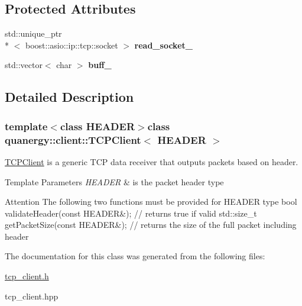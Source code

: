 \subsection*{Protected Attributes}
\begin{DoxyCompactItemize}
\item 
\hypertarget{classquanergy_1_1client_1_1TCPClient_a3169f1eb8c9ed9b452cd12ba4d51cd44}{std\-::unique\-\_\-ptr\\*
$<$ boost\-::asio\-::ip\-::tcp\-::socket $>$ {\bfseries read\-\_\-socket\-\_\-}}\label{classquanergy_1_1client_1_1TCPClient_a3169f1eb8c9ed9b452cd12ba4d51cd44}

\item 
\hypertarget{classquanergy_1_1client_1_1TCPClient_ab99a028a1b6efe74a8f62ed1f9323449}{std\-::vector$<$ char $>$ {\bfseries buff\-\_\-}}\label{classquanergy_1_1client_1_1TCPClient_ab99a028a1b6efe74a8f62ed1f9323449}

\end{DoxyCompactItemize}


\subsection{Detailed Description}
\subsubsection*{template$<$class H\-E\-A\-D\-E\-R$>$class quanergy\-::client\-::\-T\-C\-P\-Client$<$ H\-E\-A\-D\-E\-R $>$}

\hyperlink{classquanergy_1_1client_1_1TCPClient}{T\-C\-P\-Client} is a generic T\-C\-P data receiver that outputs packets based on header. 


\begin{DoxyTemplParams}{Template Parameters}
{\em H\-E\-A\-D\-E\-R} & is the packet header type \\
\hline
\end{DoxyTemplParams}
\begin{DoxyAttention}{Attention}
The following two functions must be provided for H\-E\-A\-D\-E\-R type bool validate\-Header(const H\-E\-A\-D\-E\-R\&); // returns true if valid std\-::size\-\_\-t get\-Packet\-Size(const H\-E\-A\-D\-E\-R\&); // returns the size of the full packet including header 
\end{DoxyAttention}


The documentation for this class was generated from the following files\-:\begin{DoxyCompactItemize}
\item 
\hyperlink{tcp__client_8h}{tcp\-\_\-client.\-h}\item 
tcp\-\_\-client.\-hpp\end{DoxyCompactItemize}
